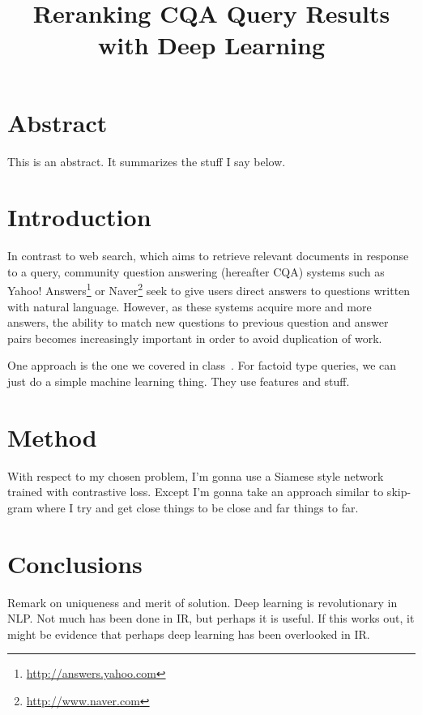 \documentclass[12pt]{article}
\title{Reranking CQA Query Results with Deep Learning}
\date{}
\begin{document}
\maketitle

\section*{Abstract}

This is an abstract. It summarizes the stuff I say below.

\section{Introduction}

In contrast to web search, which aims to retrieve relevant documents in
response to a query, community question answering (hereafter CQA) systems such
as Yahoo! Answers\footnote{\url{http://answers.yahoo.com}} or
Naver\footnote{\url{http://www.naver.com}} seek to give users direct answers
to questions written with natural language.
However, as these systems acquire more and more answers, the ability to match
new questions to previous question and answer pairs becomes increasingly
important in order to avoid duplication of work.

One approach is the one we covered in class~\cite{rightfact}.
For factoid type queries, we can just do a simple machine learning thing.
They use features and stuff.

\section{Method}

With respect to my chosen problem,
I'm gonna use a Siamese style network~\cite{siamese} trained with contrastive
loss.
Except I'm gonna take an approach similar to skip-gram where I try and get
close things to be close and far things to far.

\section{Conclusions}

Remark on uniqueness and merit of solution.
Deep learning is revolutionary in NLP.
Not much has been done in IR, but perhaps it is useful.
If this works out, it might be evidence that perhaps deep learning has been
overlooked in IR.




\end{document}

